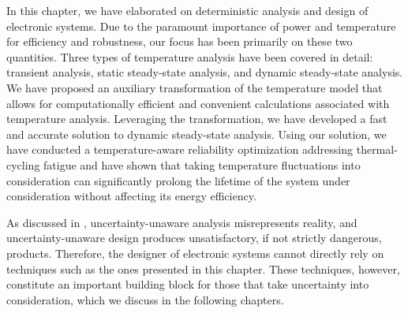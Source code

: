 In this chapter, we have elaborated on deterministic analysis and design of
electronic systems. Due to the paramount importance of power and temperature for
efficiency and robustness, our focus has been primarily on these two quantities.
Three types of temperature analysis have been covered in detail: transient
analysis, static steady-state analysis, and dynamic steady-state analysis. We
have proposed an auxiliary transformation of the temperature model that allows
for computationally efficient and convenient calculations associated with
temperature analysis. Leveraging the transformation, we have developed a fast
and accurate solution to dynamic steady-state analysis. Using our solution, we
have conducted a temperature-aware reliability optimization addressing
thermal-cycling fatigue and have shown that taking temperature fluctuations into
consideration can significantly prolong the lifetime of the system under
consideration without affecting its energy efficiency.

As discussed in , uncertainty-unaware analysis misrepresents
reality, and uncertainty-unaware design produces unsatisfactory, if not strictly
dangerous, products. Therefore, the designer of electronic systems cannot
directly rely on techniques such as the ones presented in this chapter. These
techniques, however, constitute an important building block for those that take
uncertainty into consideration, which we discuss in the following chapters.
